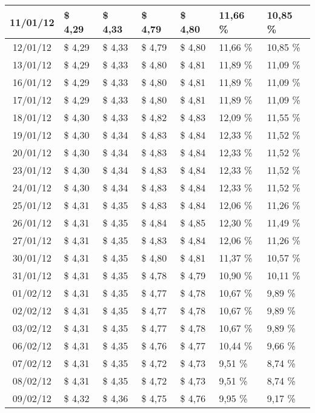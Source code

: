 \begin{center}
\begin{longtable}{|c|p{1.5cm}|p{1.5cm}|p{1.5cm}|p{1.5cm}|p{1.5cm}|p{1.5cm}|}
11/01/12 & \$ 4,29 & \$ 4,33 & \$ 4,79 & \$ 4,80 & 11,66 \% & 10,85 \% \\ \hline
12/01/12 & \$ 4,29 & \$ 4,33 & \$ 4,79 & \$ 4,80 & 11,66 \% & 10,85 \% \\ \hline
13/01/12 & \$ 4,29 & \$ 4,33 & \$ 4,80 & \$ 4,81 & 11,89 \% & 11,09 \% \\ \hline
16/01/12 & \$ 4,29 & \$ 4,33 & \$ 4,80 & \$ 4,81 & 11,89 \% & 11,09 \% \\ \hline
17/01/12 & \$ 4,29 & \$ 4,33 & \$ 4,80 & \$ 4,81 & 11,89 \% & 11,09 \% \\ \hline
18/01/12 & \$ 4,30 & \$ 4,33 & \$ 4,82 & \$ 4,83 & 12,09 \% & 11,55 \% \\ \hline
19/01/12 & \$ 4,30 & \$ 4,34 & \$ 4,83 & \$ 4,84 & 12,33 \% & 11,52 \% \\ \hline
20/01/12 & \$ 4,30 & \$ 4,34 & \$ 4,83 & \$ 4,84 & 12,33 \% & 11,52 \% \\ \hline
23/01/12 & \$ 4,30 & \$ 4,34 & \$ 4,83 & \$ 4,84 & 12,33 \% & 11,52 \% \\ \hline
24/01/12 & \$ 4,30 & \$ 4,34 & \$ 4,83 & \$ 4,84 & 12,33 \% & 11,52 \% \\ \hline
25/01/12 & \$ 4,31 & \$ 4,35 & \$ 4,83 & \$ 4,84 & 12,06 \% & 11,26 \% \\ \hline
26/01/12 & \$ 4,31 & \$ 4,35 & \$ 4,84 & \$ 4,85 & 12,30 \% & 11,49 \% \\ \hline
27/01/12 & \$ 4,31 & \$ 4,35 & \$ 4,83 & \$ 4,84 & 12,06 \% & 11,26 \% \\ \hline
30/01/12 & \$ 4,31 & \$ 4,35 & \$ 4,80 & \$ 4,81 & 11,37 \% & 10,57 \% \\ \hline
31/01/12 & \$ 4,31 & \$ 4,35 & \$ 4,78 & \$ 4,79 & 10,90 \% & 10,11 \% \\ \hline
01/02/12 & \$ 4,31 & \$ 4,35 & \$ 4,77 & \$ 4,78 & 10,67 \% & 9,89 \% \\ \hline
02/02/12 & \$ 4,31 & \$ 4,35 & \$ 4,77 & \$ 4,78 & 10,67 \% & 9,89 \% \\ \hline
03/02/12 & \$ 4,31 & \$ 4,35 & \$ 4,77 & \$ 4,78 & 10,67 \% & 9,89 \% \\ \hline
06/02/12 & \$ 4,31 & \$ 4,35 & \$ 4,76 & \$ 4,77 & 10,44 \% & 9,66 \% \\ \hline
07/02/12 & \$ 4,31 & \$ 4,35 & \$ 4,72 & \$ 4,73 & 9,51 \% & 8,74 \% \\ \hline
08/02/12 & \$ 4,31 & \$ 4,35 & \$ 4,72 & \$ 4,73 & 9,51 \% & 8,74 \% \\ \hline
09/02/12 & \$ 4,32 & \$ 4,36 & \$ 4,75 & \$ 4,76 & 9,95 \% & 9,17 \% \\ \hline

\end{longtable}
\end{center}
